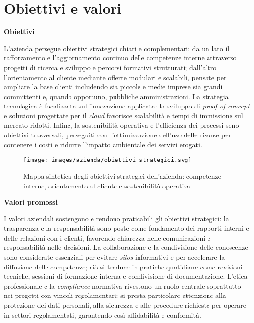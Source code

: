 \section{Obiettivi e valori}

\medskip
\noindent\textbf{Obiettivi}

L'azienda persegue obiettivi strategici chiari e complementari: da un lato il rafforzamento e l'aggiornamento continuo delle competenze interne attraverso progetti di ricerca e sviluppo e percorsi formativi
strutturati; dall'altro l'orientamento al cliente mediante offerte modulari e scalabili, pensate per ampliare la base clienti includendo sia piccole e medie imprese sia grandi committenti e,
quando opportuno, pubbliche amministrazioni. 
La strategia tecnologica è focalizzata sull'innovazione applicata: lo sviluppo di \emph{proof of concept} e soluzioni progettate per il \emph{cloud} favorisce
scalabilità e tempi di immissione sul mercato ridotti. 
Infine, la sostenibilità operativa e l'efficienza dei processi sono obiettivi trasversali, perseguiti con l'ottimizzazione dell'uso
delle risorse per contenere i costi e ridurre l'impatto ambientale dei servizi erogati.

\begin{figure}[htbp]
    \centering
    \texttt{[image: images/azienda/obiettivi\_strategici.svg]}
    \caption{Mappa sintetica degli obiettivi strategici dell’azienda: competenze interne, orientamento al cliente e sostenibilità operativa.}
    \label{fig:obiettivi}
  \end{figure}

\medskip
\noindent\textbf{Valori promossi}

I valori aziendali sostengono e rendono praticabili gli obiettivi strategici: la trasparenza e la responsabilità sono poste come fondamento dei
rapporti interni e delle relazioni con i clienti, favorendo chiarezza nelle comunicazioni e responsabilità nelle decisioni. La collaborazione e
la condivisione delle conoscenze sono considerate essenziali per evitare \emph{silos} informativi e per accelerare la diffusione delle competenze;
ciò si traduce in pratiche quotidiane come revisioni tecniche, sessioni di formazione interna e condivisione di documentazione.
L'etica professionale e la \emph{compliance} normativa rivestono un ruolo centrale soprattutto nei progetti con vincoli regolamentari:
si presta particolare attenzione alla protezione dei dati personali, alla sicurezza e alle procedure richieste per operare in settori regolamentati, garantendo così affidabilità e conformità.


